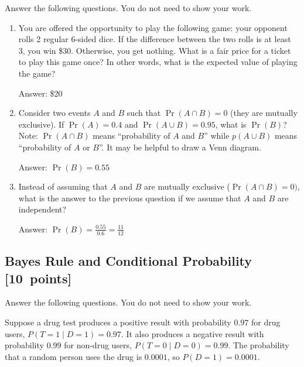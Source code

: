 \documentclass{article}
\newcommand{\blu}[1]{{\textcolor{blu}{#1}}}
\newcommand{\gre}[1]{\textcolor{gre}{#1}}
\newcommand\ans[1]{\par\gre{Answer: #1}}
\let\ask\blu
\newcommand\pts[1]{\textcolor{pointscolour}{[#1~points]}}
\begin{document}
  \ask{Answer the following questions.} You do not need to show your work.


  \begin{enumerate}
  \item You are offered the opportunity to play the following game: your opponent rolls 2 regular 6-sided dice. If the difference between the two rolls is at least 3, you win \$30. Otherwise, you get nothing. What is a fair price for a ticket to play this game once? In other words, what is the expected value of playing the game?
  
  \ans{\$20}
  
  \item Consider two events $A$ and $B$ such that $\Pr(A \cap B)=0$ (they are mutually exclusive). If $\Pr(A) = 0.4$ and $\Pr(A \cup B) = 0.95$, what is $\Pr(B)$? Note: $\Pr(A \cap B)$ means
  ``probability of $A$ and $B$'' while $p(A \cup B)$ means ``probability of $A$ or $B$''. It may be helpful to draw a Venn diagram.
  
  \ans{$\Pr(B) = 0.55$}
  \item Instead of assuming that $A$ and $B$ are mutually exclusive ($\Pr(A \cap B) = 0)$, what is the answer to the previous question if we assume that $A$ and $B$ are independent?
  
  \ans{$\Pr(B) = \frac{0.55}{0.6} = \frac{11}{12}$}


  \end{enumerate}

  \subsection{Bayes Rule and Conditional Probability \pts{10}}

  \ask{Answer the following questions.} You do not need to show your work.

  Suppose a drug test produces a positive result with probability $0.97$ for drug users, $P(T=1 \mid D=1)=0.97$. It also produces a negative result with probability $0.99$ for non-drug users, $P(T=0 \mid D=0)=0.99$. The probability that a random person uses the drug is $0.0001$, so $P(D=1)=0.0001$.
\end{document}
